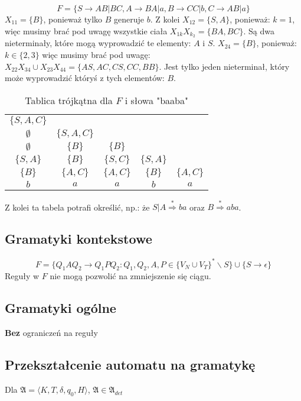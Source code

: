 \documentclass{../notatki}
\begin{document}
$$
F = \{S \rightarrow AB | BC, A \rightarrow BA | a, B \rightarrow CC |
b, C \rightarrow AB | a\}
$$
$X_{11} = \{B\}$, ponieważ tylko $B$ generuje $b$. Z kolei $X_{12} = \{S, A\}$,
ponieważ: $k = 1$, więc musimy brać pod uwagę wszystkie ciała
$X_{1k}X_{k_2} = \{BA, BC\}$. Są dwa nieterminały, które mogą
wyprowadzić te elementy: $A$ i $S$.
$X_{24} = \{B\}$, ponieważ: $k \in \{2, 3\}$ więc musimy brać pod uwagę:
$X_{22}X_{34} \cup X_{23}X_{44} = \{AS, AC, CS, CC, BB\}$. Jest tylko jeden
nieterminał, który może wyprowadzić któryś z tych elementów: $B$.
\begin{table*}[h]
  \centering
  \begin{tabular}{|ccccc}
    $\{S, A, C\}$ & & & & \\
    $\emptyset$ & $\{S, A, C\}$ & & & \\
    $\emptyset$ & $\{B\}$ & $\{B\}$ & & \\
    $\{S, A\}$ & $\{B\}$ & $\{S, C\}$ & $\{S, A\}$ & \\
    $\{B\}$ & $\{A, C\}$ & $\{A, C\}$ & $\{B\}$ & $\{A, C\}$ \\
    \hline
    $b$ & $a$ & $a$ & $b$ & $a$
  \end{tabular}
  \caption{Tablica trójkątna dla $F$ i słowa "baaba"}
\end{table*}

Z kolei ta tabela potrafi określić, np.: że $S | A
\stackrel{*}{\Rightarrow} ba$ oraz $B \stackrel{*}{\Rightarrow} aba$.

\subsection{Gramatyki kontekstowe}

$$
F = \{Q_1AQ_2 \rightarrow Q_1PQ_2 : Q_1, Q_2, A, P \in \{V_N \cup
V_T\}^* \backslash S\} \cup \{S \rightarrow \epsilon\}
$$
Reguły w $F$ nie mogą pozwolić na zmniejszenie się ciągu.

\subsection{Gramatyki ogólne}

\textbf{Bez} ograniczeń na reguły

\subsection{Przekształcenie automatu na gramatykę}

Dla $\mathfrak{A} = \langle K,T,\delta,q_0,H \rangle$, $\mathfrak{A}
\in \mathfrak{A}_{det}$
\end{document}
